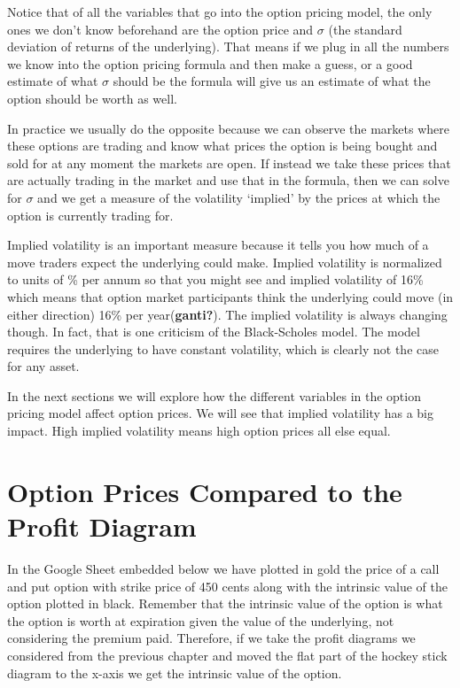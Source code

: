 \documentclass[
  letterpaper,
  DIV=11,
  numbers=noendperiod]{scrreprt}
\begin{document}
Notice that of all the variables that go into the option pricing model,
the only ones we don't know beforehand are the option price and
\(\sigma\) (the standard deviation of returns of the underlying). That
means if we plug in all the numbers we know into the option pricing
formula and then make a guess, or a good estimate of what \(\sigma\)
should be the formula will give us an estimate of what the option should
be worth as well.

In practice we usually do the opposite because we can observe the
markets where these options are trading and know what prices the option
is being bought and sold for at any moment the markets are open. If
instead we take these prices that are actually trading in the market and
use that in the formula, then we can solve for \(\sigma\) and we get a
measure of the volatility `implied' by the prices at which the option is
currently trading for.

Implied volatility is an important measure because it tells you how much
of a move traders expect the underlying could make. Implied volatility
is normalized to units of \% per annum so that you might see and implied
volatility of 16\% which means that option market participants think the
underlying could move (in either direction) 16\% per
year(\textbf{ganti?}). The implied volatility is always changing though.
In fact, that is one criticism of the Black-Scholes model. The model
requires the underlying to have constant volatility, which is clearly
not the case for any asset.

In the next sections we will explore how the different variables in the
option pricing model affect option prices. We will see that implied
volatility has a big impact. High implied volatility means high option
prices all else equal.

\section{Option Prices Compared to the Profit
Diagram}\label{option-prices-compared-to-the-profit-diagram}

In the Google Sheet embedded below we have plotted in gold the price of
a call and put option with strike price of 450 cents along with the
intrinsic value of the option plotted in black. Remember that the
intrinsic value of the option is what the option is worth at expiration
given the value of the underlying, not considering the premium paid.
Therefore, if we take the profit diagrams we considered from the
previous chapter and moved the flat part of the hockey stick diagram to
the x-axis we get the intrinsic value of the option.
\end{document}
